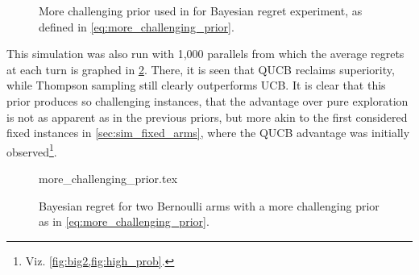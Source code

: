 \begin{figure}[t]
    \centering
    \caption[
        More challenging prior used in Bayesian regret experiment.
    ]
    {
        More challenging prior used in for Bayesian regret experiment, as defined in \cref{eq:more_challenging_prior}.
    }
    \label{fig:prior2}
\end{figure}


This simulation was also run with 1,000 parallels from which the average regrets at each turn is graphed in \cref{fig:random3}.
There, it is seen that QUCB reclaims superiority, while Thompson sampling still clearly outperforms UCB.
It is clear that this prior produces so challenging instances, that the advantage over pure exploration is not as apparent as in the previous priors, but more akin to the first considered fixed instances in \cref{sec:sim_fixed_arms}, where the QUCB advantage was initially observed\footnote{Viz. \cref{fig:big2,fig:high_prob}.}.



\begin{figure}[t]
    \centering
    \newcommand{\myoptions}{
        width=10cm,
        height=8cm,
        xlabel={Kiloturn},
        ylabel={Regret},
        legend entries={UCB, QUCB, Thompson},
        legend pos=north west,
        legend cell align=left,
        mystyle,
    }
    {more_challenging_prior.tex}
    \caption[
        Bayesian regret for two Bernoulli arms, more challenging prior.
    ]
    {
        Bayesian regret for two Bernoulli arms with a more challenging prior as in \cref{eq:more_challenging_prior}.
    }
    \label{fig:random3}
\end{figure}

